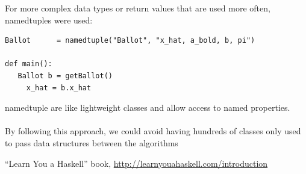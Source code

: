 \documentclass[a4paper,12pt]{report}
\theoremstyle{definition}
\begin{document}
For more complex data types or return values that are used more often, namedtuples were used:
\begin{verbatim}
Ballot      = namedtuple("Ballot", "x_hat, a_bold, b, pi")

def main():
   Ballot b = getBallot()
	 x_hat = b.x_hat
\end{verbatim}
namedtuple are like lightweight classes and allow access to named properties.
\\\\\noindent By following this approach, we could avoid having hundreds of classes only used to pass data structures between the algorithms
\begin{thebibliography}{999}
 "`Learn You a Haskell"' book, \url{http://learnyouahaskell.com/introduction}
\end{thebibliography}
\end{document}
